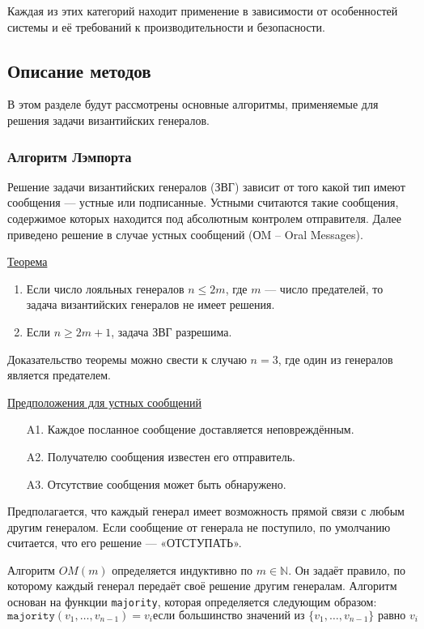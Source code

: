 Каждая из этих категорий находит применение в зависимости от особенностей системы и её требований к производительности и безопасности.

\subsection{Описание методов}

\hspace{1.25cm}
В этом разделе будут рассмотрены основные алгоритмы, применяемые для решения задачи византийских генералов.


\subsubsection{Алгоритм Лэмпорта}

\hspace{1.25cm}
Решение задачи византийских генералов (ЗВГ) зависит от того какой тип имеют сообщения — устные или подписанные. Устными считаются такие сообщения, содержимое которых находится под абсолютным контролем отправителя. Далее приведено решение в случае устных сообщений (ОM -- Oral Messages).

\underline{Теорема}
\begin{enumerate}
    \item Если число лояльных генералов $n \leq 2m$, где $m$ — число предателей, то задача византийских генералов не имеет решения.
    \item Если $n \geq 2m + 1$, задача ЗВГ разрешима.
\end{enumerate}

Доказательство теоремы можно свести к случаю $n = 3$, где один из генералов является предателем.

\underline{Предположения для устных сообщений}
\begin{enumerate}
    \item[A1.] Каждое посланное сообщение доставляется неповреждённым.
    \item[A2.] Получателю сообщения известен его отправитель.
    \item[A3.] Отсутствие сообщения может быть обнаружено.
\end{enumerate}

Предполагается, что каждый генерал имеет возможность прямой связи с любым другим генералом. Если сообщение от генерала не поступило, по умолчанию считается, что его решение — «ОТСТУПАТЬ».

Алгоритм \(OM(m)\) определяется индуктивно по \(m \in \mathbb{N}\). Он задаёт правило, по которому каждый генерал передаёт своё решение другим генералам. Алгоритм основан на функции \texttt{majority}, которая определяется следующим образом:
\[
\texttt{majority}(v_1, \dots, v_{n-1}) = v_i \text{если большинство значений из } \{v_1, \dots, v_{n-1}\} \text{ равно } v_i
\]

